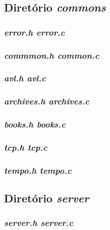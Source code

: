 \documentclass[a4paper,10pt]{article}
\begin{document}
\subsection{Diretório \textit{commons}}
\subsubsection{\label{itm:error.c}\emph{error.h error.c}}


\subsubsection{\label{itm:common.c}\emph{commmon.h common.c}}


\subsubsection{\label{itm:avl.c}\emph{avl.h avl.c}}


\subsubsection{\label{itm:archives.c}\emph{archives.h archives.c}}


\subsubsection{\label{itm:books.c}\emph{books.h books.c}}


\subsubsection{\label{itm:tcp.c}\emph{tcp.h tcp.c}}


\subsubsection{\label{itm:tempo.c}\emph{tempo.h tempo.c}}


\subsection{Diretório \textit{server}}
\subsubsection{\label{itm:server.c}\emph{server.h server.c}}


\end{document}
